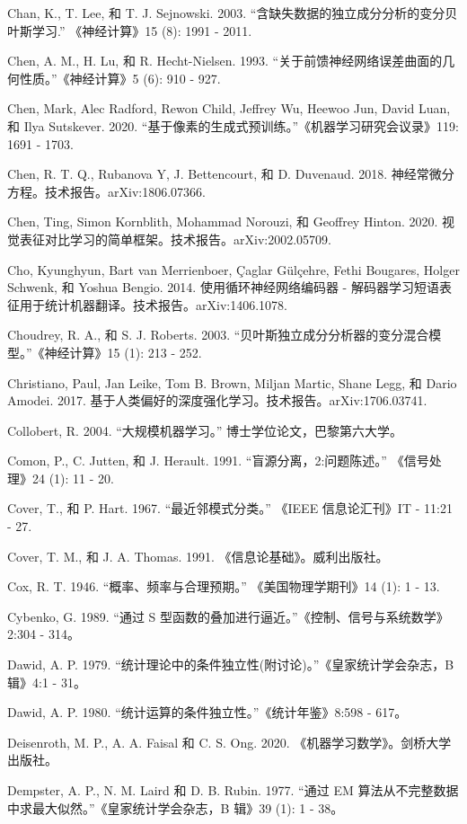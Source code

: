 \documentclass[10pt]{article}
\begin{document}
Chan, K., T. Lee, 和 T. J. Sejnowski. 2003. “含缺失数据的独立成分分析的变分贝叶斯学习.” 《神经计算》15 (8): 1991 - 2011.

Chen, A. M., H. Lu, 和 R. Hecht-Nielsen. 1993. “关于前馈神经网络误差曲面的几何性质。”《神经计算》5 (6): 910 - 927.

Chen, Mark, Alec Radford, Rewon Child, Jeffrey Wu, Heewoo Jun, David Luan, 和 Ilya Sutskever. 2020. “基于像素的生成式预训练。”《机器学习研究会议录》119: 1691 - 1703.

Chen, R. T. Q., Rubanova Y, J. Bettencourt, 和 D. Duvenaud. 2018. 神经常微分方程。技术报告。arXiv:1806.07366.

Chen, Ting, Simon Kornblith, Mohammad Norouzi, 和 Geoffrey Hinton. 2020. 视觉表征对比学习的简单框架。技术报告。arXiv:2002.05709.

Cho, Kyunghyun, Bart van Merrienboer, Çaglar Gülçehre, Fethi Bougares, Holger Schwenk, 和 Yoshua Bengio. 2014. 使用循环神经网络编码器 - 解码器学习短语表征用于统计机器翻译。技术报告。arXiv:1406.1078.

Choudrey, R. A., 和 S. J. Roberts. 2003. “贝叶斯独立成分分析器的变分混合模型。”《神经计算》15 (1): 213 - 252.

Christiano, Paul, Jan Leike, Tom B. Brown, Miljan Martic, Shane Legg, 和 Dario Amodei. 2017. 基于人类偏好的深度强化学习。技术报告。arXiv:1706.03741.

Collobert, R. 2004. “大规模机器学习。” 博士学位论文，巴黎第六大学。

Comon, P., C. Jutten, 和 J. Herault. 1991. “盲源分离，2:问题陈述。” 《信号处理》24 (1): 11 - 20.

Cover, T., 和 P. Hart. 1967. “最近邻模式分类。” 《IEEE 信息论汇刊》IT - 11:21 - 27.

Cover, T. M., 和 J. A. Thomas. 1991. 《信息论基础》。威利出版社。

Cox, R. T. 1946. “概率、频率与合理预期。” 《美国物理学期刊》14 (1): 1 - 13.

Cybenko, G. 1989. “通过 S 型函数的叠加进行逼近。”《控制、信号与系统数学》2:304 - 314。

Dawid, A. P. 1979. “统计理论中的条件独立性(附讨论)。”《皇家统计学会杂志，B 辑》4:1 - 31。

Dawid, A. P. 1980. “统计运算的条件独立性。”《统计年鉴》8:598 - 617。

Deisenroth, M. P., A. A. Faisal 和 C. S. Ong. 2020. 《机器学习数学》。剑桥大学出版社。

Dempster, A. P., N. M. Laird 和 D. B. Rubin. 1977. “通过 EM 算法从不完整数据中求最大似然。”《皇家统计学会杂志，B 辑》39 (1): 1 - 38。
\end{document}
